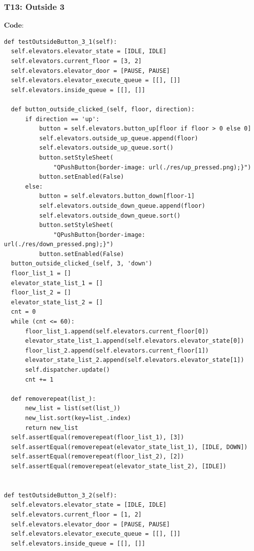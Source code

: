 \documentclass{article}
\begin{document}
\subsubsection*{T13: Outside 3}
$\textbf{Code:}$
\begin{lstlisting}
def testOutsideButton_3_1(self):
  self.elevators.elevator_state = [IDLE, IDLE]
  self.elevators.current_floor = [3, 2]
  self.elevators.elevator_door = [PAUSE, PAUSE]
  self.elevators.elevator_execute_queue = [[], []]
  self.elevators.inside_queue = [[], []]

  def button_outside_clicked_(self, floor, direction):
      if direction == 'up':
          button = self.elevators.button_up[floor if floor > 0 else 0]
          self.elevators.outside_up_queue.append(floor)
          self.elevators.outside_up_queue.sort()
          button.setStyleSheet(
              "QPushButton{border-image: url(./res/up_pressed.png);}")
          button.setEnabled(False)
      else:
          button = self.elevators.button_down[floor-1]
          self.elevators.outside_down_queue.append(floor)
          self.elevators.outside_down_queue.sort()
          button.setStyleSheet(
              "QPushButton{border-image: url(./res/down_pressed.png);}")
          button.setEnabled(False)
  button_outside_clicked_(self, 3, 'down')
  floor_list_1 = []
  elevator_state_list_1 = []
  floor_list_2 = []
  elevator_state_list_2 = []
  cnt = 0
  while (cnt <= 60):
      floor_list_1.append(self.elevators.current_floor[0])
      elevator_state_list_1.append(self.elevators.elevator_state[0])
      floor_list_2.append(self.elevators.current_floor[1])
      elevator_state_list_2.append(self.elevators.elevator_state[1])
      self.dispatcher.update()
      cnt += 1

  def removerepeat(list_):
      new_list = list(set(list_))
      new_list.sort(key=list_.index)
      return new_list
  self.assertEqual(removerepeat(floor_list_1), [3])
  self.assertEqual(removerepeat(elevator_state_list_1), [IDLE, DOWN])
  self.assertEqual(removerepeat(floor_list_2), [2])
  self.assertEqual(removerepeat(elevator_state_list_2), [IDLE])


def testOutsideButton_3_2(self):
  self.elevators.elevator_state = [IDLE, IDLE]
  self.elevators.current_floor = [1, 2]
  self.elevators.elevator_door = [PAUSE, PAUSE]
  self.elevators.elevator_execute_queue = [[], []]
  self.elevators.inside_queue = [[], []]


\end{lstlisting}
\end{document}
